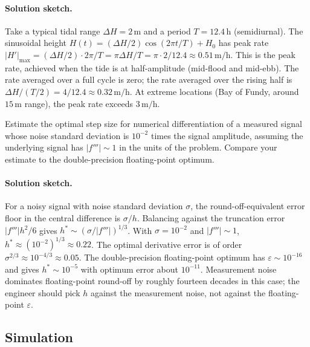 \paragraph{Solution sketch.}
Take a typical tidal range $\Delta H = 2 \,\si{\meter}$ and a
period $T = 12.4 \,\si{\hour}$ (semidiurnal). The sinusoidal
height $H(t) = (\Delta H / 2) \cos(2 \pi t / T) + H_{0}$ has
peak rate $|H'|_{\max} = (\Delta H / 2) \cdot 2 \pi / T = \pi
\Delta H / T = \pi \cdot 2 / 12.4 \approx 0.51 \,\si{\meter\per
\hour}$. This is the peak rate, achieved when the tide is at
half-amplitude (mid-flood and mid-ebb). The rate averaged over a
full cycle is zero; the rate averaged over the rising half is
$\Delta H / (T/2) = 4 / 12.4 \approx 0.32 \,\si{\meter\per\hour}$.
At extreme locations (Bay of Fundy, around $15 \,\si{\meter}$
range), the peak rate exceeds $3 \,\si{\meter\per\hour}$.

\begin{exercise}
Estimate the optimal step size for numerical differentiation of
a measured signal whose noise standard deviation is $10^{-2}$
times the signal amplitude, assuming the underlying signal has
$|f'''| \sim 1$ in the units of the problem. Compare your
estimate to the double-precision floating-point optimum.
\end{exercise}

\paragraph{Solution sketch.}
For a noisy signal with noise standard deviation $\sigma$, the
round-off-equivalent error floor in the central difference is
$\sigma / h$. Balancing against the truncation error $|f'''| h^{2}
/ 6$ gives $h^{*} \sim (\sigma / |f'''|)^{1/3}$. With
$\sigma = 10^{-2}$ and $|f'''| \sim 1$, $h^{*} \approx
(10^{-2})^{1/3} \approx 0.22$. The optimal derivative error is
of order $\sigma^{2/3} \approx 10^{-4/3} \approx 0.05$. The
double-precision floating-point optimum has $\varepsilon \sim
10^{-16}$ and gives $h^{*} \sim 10^{-5}$ with optimum error
about $10^{-11}$. Measurement noise dominates floating-point
round-off by roughly fourteen decades in this case; the engineer
should pick $h$ against the measurement noise, not against the
floating-point $\varepsilon$.

\subsection*{Simulation}

